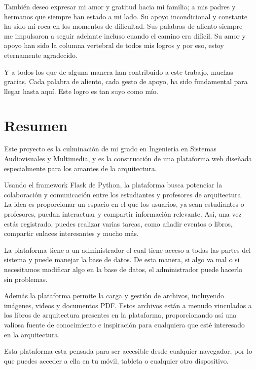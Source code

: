 \documentclass[a4paper, 12pt]{book}
\begin{document}
También deseo expresar mi amor y gratitud hacia mi familia; a mis padres y hermanos que siempre han estado a mi lado. 
Su apoyo incondicional y constante ha sido mi roca en los momentos de dificultad. Sus palabras de aliento siempre me 
impulsaron a seguir adelante incluso cuando el camino era difícil. Su amor y apoyo han sido la columna vertebral de 
todos mis logros y por eso, estoy eternamente agradecido. 

Y a todos los que de alguna manera han contribuido a este trabajo, muchas gracias. Cada palabra de aliento, cada 
gesto de apoyo, ha sido fundamental para llegar hasta aquí. Este logro es tan suyo como mío.



\chapter*{Resumen}

Este proyecto es la culminación de mi grado en Ingeniería en Sistemas Audiovisuales y Multimedia, y es la construcción de una 
plataforma web diseñada especialmente para los amantes de la arquitectura. 

Usando el framework Flask de Python, la plataforma busca potenciar la colaboración y comunicación entre los estudiantes y profesores 
de arquitectura. La idea es proporcionar un espacio en el que los usuarios, ya sean estudiantes o profesores, puedan interactuar y 
compartir información relevante. Así, una vez estás registrado, puedes realizar varias tareas, como añadir eventos o libros, compartir 
enlaces interesantes y mucho más. 

La plataforma tiene a un administrador el cual tiene acceso a todas las partes del sistema y puede manejar la base de datos. 
De esta manera, si algo va mal o si necesitamos modificar algo en la base de datos, el administrador puede hacerlo sin problemas.

Además la plataforma permite la carga y gestión de archivos, incluyendo imágenes, videos y documentos PDF. Estos 
archivos están a menudo vinculados a los libros de arquitectura presentes en la plataforma, proporcionando así una valiosa fuente de 
conocimiento e inspiración para cualquiera que esté interesado en la arquitectura. 

Esta plataforma esta pensada para ser accesible desde cualquier navegador, por lo que puedes acceder a ella en tu móvil, tableta o 
cualquier otro dispositivo. 
\end{document}
